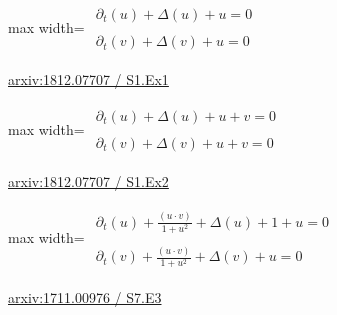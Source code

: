 \documentclass[UTF8,10pt,a4paper,fontset=mac]{ctexart}
\begin{document}
\begin{minipage}{\linewidth}\begin{center}\begin{adjustbox}{max width=\linewidth}$\displaystyle\begin{gathered}\begin{gathered}\partial_{t}(u)+\Delta(u)+u=0\end{gathered}\\[5pt]\begin{gathered}\partial_{t}(v)+\Delta(v)+u=0\end{gathered}\end{gathered}$\end{adjustbox}\end{center}{\small\href{https://arxiv.org/html/1812.07707#S1.Ex1}{arxiv:1812.07707 / S1.Ex1}}\par\end{minipage}\par\vspace{6mm}

\begin{minipage}{\linewidth}\begin{center}\begin{adjustbox}{max width=\linewidth}$\displaystyle\begin{gathered}\begin{gathered}\partial_{t}(u)+\Delta(u)+u+v=0\end{gathered}\\[5pt]\begin{gathered}\partial_{t}(v)+\Delta(v)+u+v=0\end{gathered}\end{gathered}$\end{adjustbox}\end{center}{\small\href{https://arxiv.org/html/1812.07707#S1.Ex2}{arxiv:1812.07707 / S1.Ex2}}\par\end{minipage}\par\vspace{6mm}

\begin{minipage}{\linewidth}\begin{center}\begin{adjustbox}{max width=\linewidth}$\displaystyle\begin{gathered}\begin{gathered}\partial_{t}(u)+\frac{(u\cdot v)}{1+u^{2}}+\Delta(u)+1+u=0\end{gathered}\\[5pt]\begin{gathered}\partial_{t}(v)+\frac{(u\cdot v)}{1+u^{2}}+\Delta(v)+u=0\end{gathered}\end{gathered}$\end{adjustbox}\end{center}{\small\href{https://arxiv.org/html/1711.00976#S7.E3}{arxiv:1711.00976 / S7.E3}}\par\end{minipage}\par\vspace{6mm}
\end{document}
